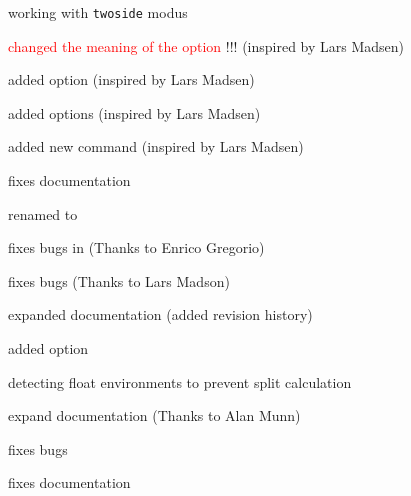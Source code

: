 \documentclass[parskip=false,english,11pt]{ltxmdf}
\begin{document}
\begin{itemize*}
\item working with \texttt{twoside} modus
\end{itemize*}

\begin{itemize*}
\item \textcolor{red}{changed the meaning of the option }!!! (inspired by Lars Madsen)
\item added option  (inspired by Lars Madsen)
\item added options  (inspired by Lars Madsen)
\item added new command  (inspired by Lars Madsen)
\item fixes documentation
\item renamed  to 
\end{itemize*}



\begin{itemize*}
\item fixes bugs in  (Thanks to Enrico Gregorio)
\end{itemize*}

\begin{itemize*}
\item fixes bugs (Thanks to Lars Madson)
\item expanded documentation (added revision history)
\end{itemize*}


\begin{itemize*}
\item added option 
\item detecting float environments to prevent split calculation
\item expand documentation (Thanks to Alan Munn)
\end{itemize*}

\begin{itemize*}
\item fixes bugs
\item fixes documentation
\end{itemize*}
\end{document}
